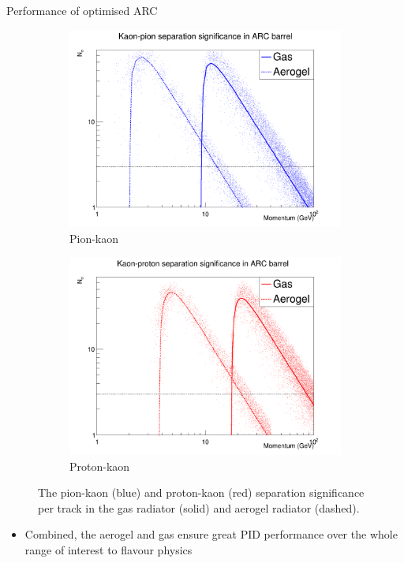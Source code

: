 \documentclass{beamer}
\begin{document}
\begin{frame}{Performance of optimised ARC}
  \begin{figure}
    \centering
    \vspace{-0.2cm}
    \begin{subfigure}{0.5\textwidth}
      \includegraphics[width = 1.0\textwidth]{Plots/Significance_Scatter_PionKaon.png}
      \caption{Pion-kaon}
    \end{subfigure}%
    \begin{subfigure}{0.5\textwidth}
      \includegraphics[width = 1.0\textwidth]{Plots/Significance_Scatter_ProtonKaon.png}
      \caption{Proton-kaon}
    \end{subfigure}
    \caption{The pion-kaon (blue) and proton-kaon (red) separation significance per track in the gas radiator (solid) and aerogel radiator (dashed).}
  \end{figure}
  \vspace{-0.5cm}
  \begin{itemize}
    \setlength\itemsep{1.0em}
    \item{Combined, the aerogel and gas ensure great PID performance over the whole range of interest to flavour physics}
  \end{itemize}
\end{frame}
\end{document}
